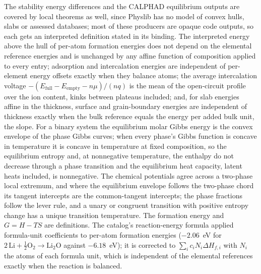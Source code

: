 \documentclass[11pt,a4paper]{article}
\begin{document}
The stability energy differences and the CALPHAD equilibrium outputs are covered by local theorems as well, since Physlib has no model of convex hulls, slabs or assessed databases; most of these producers are opaque code outputs, so each gets an interpreted definition stated in its binding. The interpreted energy above the hull of per-atom formation energies does not depend on the elemental reference energies and is unchanged by any affine function of composition applied to every entry; adsorption and intercalation energies are independent of per-element energy offsets exactly when they balance atoms; the average intercalation voltage $-(E_{\mathrm{full}} - E_{\mathrm{empty}} - n\mu)/(nq)$ is the mean of the open-circuit profile over the ion content, kinks between plateaus included; and, for slab energies affine in the thickness, surface and grain-boundary energies are independent of thickness exactly when the bulk reference equals the energy per added bulk unit, the slope. For a binary system the equilibrium molar Gibbs energy is the convex envelope of the phase Gibbs curves; when every phase's Gibbs function is concave in temperature it is concave in temperature at fixed composition, so the equilibrium entropy and, at nonnegative temperature, the enthalpy do not decrease through a phase transition and the equilibrium heat capacity, latent heats included, is nonnegative. The chemical potentials agree across a two-phase local extremum, and where the equilibrium envelope follows the two-phase chord its tangent intercepts are the common-tangent intercepts; the phase fractions follow the lever rule, and a unary or congruent transition with positive entropy change has a unique transition temperature. The formation energy and $G = H - TS$ are definitions. The catalog's reaction-energy formula applied formula-unit coefficients to per-atom formation energies ($-2.06$~eV for $2\,\mathrm{Li} + \tfrac{1}{2}\mathrm{O}_2 \to \mathrm{Li_2O}$ against $-6.18$~eV); it is corrected to $\sum_i c_i N_i \Delta H_{f,i}$ with $N_i$ the atoms of each formula unit, which is independent of the elemental references exactly when the reaction is balanced.
\end{document}
